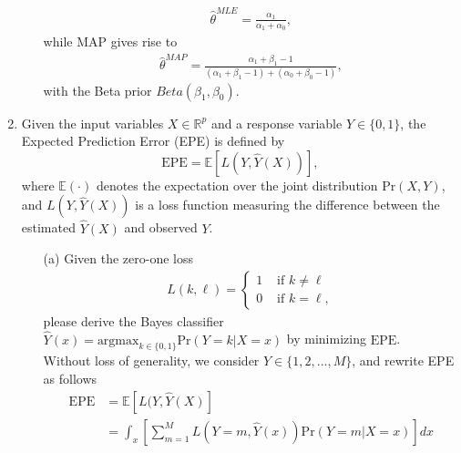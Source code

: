 \documentclass[10pt]{article}
\begin{document}
\begin{enumerate}[1.]
\begin{itemize}
{\begin{align*}
                        \hat{\theta}^{MLE} = \frac{\alpha_1}{\alpha_1+\alpha_0},
                    \end{align*}
                    while MAP gives rise to
                    \begin{align*}
                        \hat{\theta}^{MAP} = \frac{\alpha_1 + \beta_1 - 1}{(\alpha_1 + \beta_1 - 1) + (\alpha_0 + \beta_0 - 1)},
                    \end{align*}
                    with the Beta prior $Beta(\beta_1, \beta_0)$.
                    }
          \end{itemize}



    \item  Given the input variables $X \in \mathbb{R}^p$ and a response variable $Y \in \{ 0,1 \}$, the Expected Prediction Error (EPE) is defined by
          \begin{equation*}
              \text{EPE} = \mathbb{E}[L(Y,\hat{Y}(X))],
          \end{equation*}
          where $\mathbb{E}(\cdot)$ denotes the expectation over the joint distribution $\text{Pr}(X,Y)$, and $L(Y,\hat{Y}(X))$ is a loss
          function measuring the difference between the estimated $\hat{Y}(X)$ and observed $Y$.
          \begin{itemize}
              \item[(a)] Given the zero-one loss
                    \begin{align*}
                        L(k,\ell)=\left\{\begin{array}{ll}
                            1 & \text { if } k \neq \ell \\
                            0 & \text { if } k = \ell,
                        \end{array}\right.
                    \end{align*}
                    please derive the Bayes classifier $\hat{Y}(x) = \text{argmax}_{k \in \{ 0,1\}} \text{Pr}(Y=k|X=x)$ by minimizing $\text{EPE}$.~ \\
                    { \color{blue}
                    Without loss of generality, we consider $Y \in \{1,2,...,M \}$, and rewrite EPE as follows
                    \begin{align*}
                        \text{EPE} & = \mathbb{E}[L(Y, \hat{Y}(X)]                                                                \\
                                   & =\int_{x} \left[ \sum_{m=1}^M L\left(Y=m,\hat{Y}(x)\right) \text{Pr}(Y=m | X=x) \right] dx \\

\end{align*}}
\end{itemize}
\end{enumerate}
\end{document}
